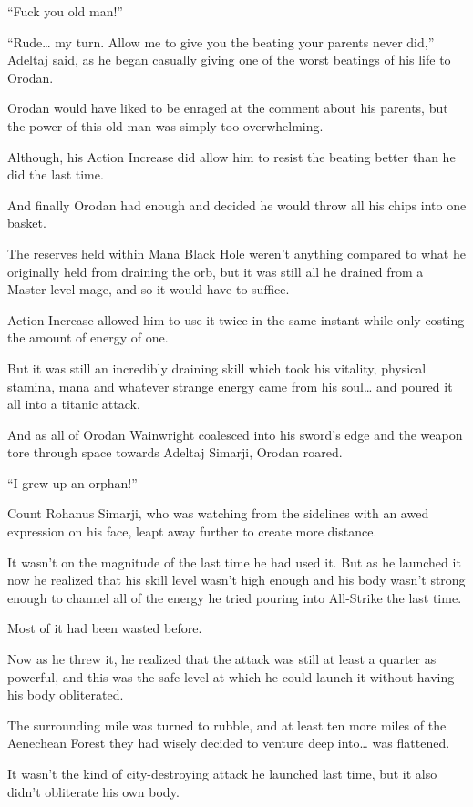 \documentclass[a4paper,10pt]{book}
\begin{document}
“Fuck you old man!”\par
“Rude… my turn. Allow me to give you the beating your parents never did,” Adeltaj said, as he began casually giving one of the worst beatings of his life to Orodan.\par
Orodan would have liked to be enraged at the comment about his parents, but the power of this old man was simply too overwhelming.\par
Although, his Action Increase did allow him to resist the beating better than he did the last time.\par
And finally Orodan had enough and decided he would throw all his chips into one basket.\par
The reserves held within Mana Black Hole weren’t anything compared to what he originally held from draining the orb, but it was still all he drained from a Master-level mage, and so it would have to suffice.\par
Action Increase allowed him to use it twice in the same instant while only costing the amount of energy of one.\par
But it was still an incredibly draining skill which took his vitality, physical stamina, mana and whatever strange energy came from his soul… and poured it all into a titanic attack.\par
And as all of Orodan Wainwright coalesced into his sword’s edge and the weapon tore through space towards Adeltaj Simarji, Orodan roared.\par
“I grew up an orphan!”\par
Count Rohanus Simarji, who was watching from the sidelines with an awed expression on his face, leapt away further to create more distance.\par
It wasn’t on the magnitude of the last time he had used it. But as he launched it now he realized that his skill level wasn’t high enough and his body wasn’t strong enough to channel all of the energy he tried pouring into All-Strike the last time.\par
Most of it had been wasted before.\par
Now as he threw it, he realized that the attack was still at least a quarter as powerful, and this was the safe level at which he could launch it without having his body obliterated.\par
The surrounding mile was turned to rubble, and at least ten more miles of the Aenechean Forest they had wisely decided to venture deep into… was flattened.\par
It wasn’t the kind of city-destroying attack he launched last time, but it also didn’t obliterate his own body.\par
\end{document}
